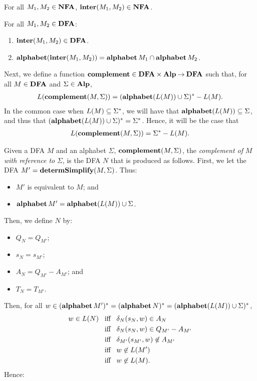 \begin{proposition}
For all $M_1,M_2\in\mathbf{NFA}$, $\mathbf{inter}(M_1,M_2)\in\mathbf{NFA}$.
\end{proposition}

\begin{proposition}
For all $M_1,M_2\in\mathbf{DFA}$:
\begin{enumerate}[\quad(1)]
\item $\mathbf{inter}(M_1,M_2)\in\mathbf{DFA}$.

\item $\mathbf{alphabet}(\mathbf{inter}(M_1,M_2)) = \mathbf{alphabet}\,M_1\cap\mathbf{alphabet}\,M_2$.
\end{enumerate}
\end{proposition}

Next, we define a function $\mathbf{complement}\in\mathbf{DFA}\times\mathbf{Alp}\mathbin{\to}\mathbf{DFA}$
such that, for all $M\in\mathbf{DFA}$ and $\Sigma\in\mathbf{Alp}$,
\begin{gather*}
L(\mathbf{complement}(M,\Sigma)) = (\mathbf{alphabet}(L(M))\cup\Sigma)^*-L(M) .
\end{gather*}
In the common case when $L(M)\subseteq\Sigma^*$, we will have that
$\mathbf{alphabet}(L(M))\subseteq\Sigma$, and thus that
$(\mathbf{alphabet}(L(M))\cup\Sigma)^*=\Sigma^*$.  Hence, it will be the case
that
\begin{gather*}
L(\mathbf{complement}(M,\Sigma)) = \Sigma^*-L(M) .
\end{gather*}

Given a DFA $M$ and an alphabet $\Sigma$, $\mathbf{complement}(M,\Sigma)$,
the \emph{complement of} $M$ \emph{with reference to} $\Sigma$,
is the DFA $N$ that is produced as follows.  First, we let the DFA
$M'=\mathbf{determSimplify}(M,\Sigma)$.  Thus:
\begin{itemize}
\item $M'$ is equivalent to $M$; and

\item $\mathbf{alphabet}\,M' = \mathbf{alphabet}(L(M))\cup\Sigma$.
\end{itemize}
Then, we define $N$ by:
\begin{itemize}
\item $Q_N = Q_{M'}$;

\item $s_N = s_{M'}$;

\item $A_N = Q_{M'} - A_{M'}$; and

\item $T_N = T_{M'}$.
\end{itemize}
Then, for all $w\in(\mathbf{alphabet}\,M')^*=
(\mathbf{alphabet}\,N)^*=(\mathbf{alphabet}(L(M))\cup\Sigma)^*$,
\begin{align*}
w\in L(N) &\mathrel{\;\;\allowbreak\mbox{iff}\allowbreak\;\;} \delta_N(s_N, w)\in A_N \\
&\mathrel{\;\;\allowbreak\mbox{iff}\allowbreak\;\;} \delta_N(s_N, w)\in Q_{M'}-A_{M'} \\
&\mathrel{\;\;\allowbreak\mbox{iff}\allowbreak\;\;} \delta_{M'}(s_{M'}, w)\not\in A_{M'} \\
&\mathrel{\;\;\allowbreak\mbox{iff}\allowbreak\;\;} w\not\in L(M') \\
&\mathrel{\;\;\allowbreak\mbox{iff}\allowbreak\;\;} w\not\in L(M) .
\end{align*}
Hence:

